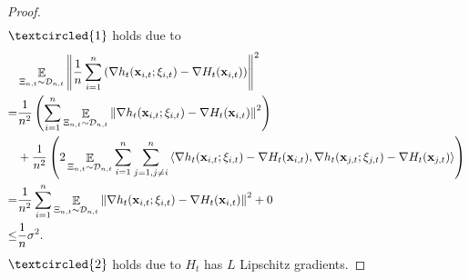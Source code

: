 \documentclass{article}
\begin{document}
\begin{proof}
\begin{align}
\end{align} $\textcircled{1}$ holds due to
\begin{align}
\nonumber
& \mathop{\mathbb{E}}_{ \Xi_{n,t} \sim \mathcal{D}_{n,t} }\left\lVert\frac{1}{n}\sum_{i=1}^n \left(  \nabla h_t({\bf x}_{i,t};\xi_{i,t}) - \nabla H_t({\bf x}_{i,t})  \right) \right\rVert^2 \\ \nonumber 
= & \frac{1}{n^2}\left(  \sum_{i=1}^n \mathop{\mathbb{E}}_{ \Xi_{n,t} \sim \mathcal{D}_{n,t} }\left\lVert \nabla h_t({\bf x}_{i,t};\xi_{i,t}) - \nabla H_t({\bf x}_{i,t}) \right\rVert^2   \right) \\ \nonumber 
& + \frac{1}{n^2}\left( 2\mathop{\mathbb{E}}_{ \Xi_{n,t} \sim \mathcal{D}_{n,t} }\sum_{i=1}^n\sum_{j=1, j\neq i}^n\left\langle \nabla h_t({\bf x}_{i,t};\xi_{i,t}) - \nabla H_t({\bf x}_{i,t}),  \nabla h_t({\bf x}_{j,t};\xi_{j,t}) - \nabla H_t({\bf x}_{j,t}) \right\rangle  \right) \\ \nonumber
= & \frac{1}{n^2}\sum_{i=1}^n \mathop{\mathbb{E}}_{ \Xi_{n,t} \sim \mathcal{D}_{n,t} }\left\lVert \nabla h_t({\bf x}_{i,t};\xi_{i,t}) - \nabla H_t({\bf x}_{i,t}) \right\rVert^2 + 0 \\ \nonumber
\le & \frac{1}{n} \sigma^2.
\end{align} $\textcircled{2}$ holds due to $H_t$ has $L$ Lipschitz gradients.



\end{proof}
\end{document}
